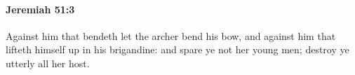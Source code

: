 
		\paragraph{Jeremiah 51:3} %
			\label{JEREMIAH-51-3}

			Against him that bendeth let the archer bend his bow, and against him that lifteth himself up in his brigandine: and spare ye not her young men; destroy ye utterly all her host.


